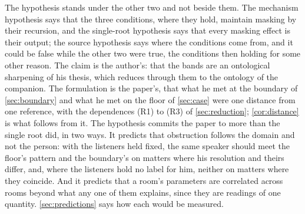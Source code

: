 The hypothesis stands under the other two and not beside them. The mechanism hypothesis says that the three conditions, where they hold, maintain masking by their recursion, and the single-root hypothesis says that every masking effect is their output; the source hypothesis says where the conditions come from, and it could be false while the other two were true, the conditions then holding for some other reason. The claim is the author's: that the bands are an ontological sharpening of his thesis, which reduces through them to the ontology of the companion. The formulation is the paper's, that what he met at the boundary of \autoref{sec:boundary} and what he met on the floor of \autoref{sec:case} were one distance from one reference, with the dependences (R1) to (R3) of \autoref{sec:reduction}; \autoref{cor:distance} is what follows from it. The hypothesis commits the paper to more than the single root did, in two ways. It predicts that obstruction follows the domain and not the person: with the listeners held fixed, the same speaker should meet the floor's pattern and the boundary's on matters where his resolution and theirs differ, and, where the listeners hold no label for him, neither on matters where they coincide. And it predicts that a room's parameters are correlated across rooms beyond what any one of them explains, since they are readings of one quantity. \autoref{sec:predictions} says how each would be measured.

